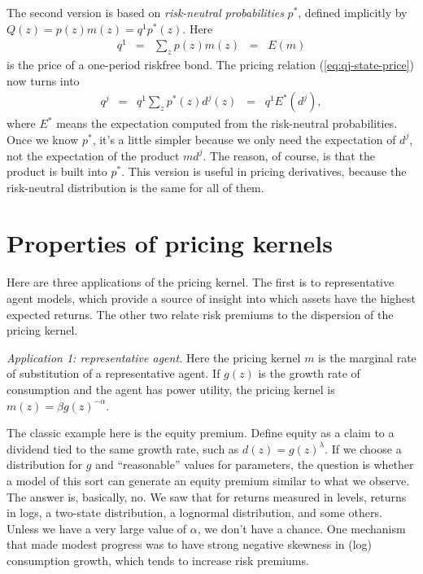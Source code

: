 \documentclass[11pt]{article}
\begin{document}
The second version is based on
{\it risk-neutral probabilities\/} $p^*$,
defined implicitly by $ Q(z) = p(z) m(z) = q^1 p^*(z)$.
Here
\begin{eqnarray*}
    q^1 &=& \sum_z p(z) m(z) \;\;=\;\; E(m)
\end{eqnarray*}
is the price of a one-period riskfree bond.
The pricing relation (\ref{eq:qj-state-price}) now turns into
\begin{eqnarray}
    q^j &=& q^1 \sum_z p^*(z) d^j(z)  \;\;=\;\; q^1 E^* (d^j) ,
    \label{eq:q=Estar-d}
\end{eqnarray}
where $E^*$ means the expectation computed from the risk-neutral probabilities.
Once we know $p^*$, it's a little simpler because we only need the
expectation of $d^j$, not the expectation of the product $m d^j$.
The reason, of course, is that the product is built into $p^*$.
This version is useful in pricing derivatives,
because the risk-neutral distribution is the same for all of them.


\section{Properties of pricing kernels}

Here are three applications of the pricing kernel.
The first is to representative agent models,
which provide a source of insight into which assets have
the highest expected returns.
The other two relate risk premiums to the dispersion of the pricing kernel.

{\it Application 1:  representative agent.\/}
Here the pricing kernel $m$ is the marginal rate of substitution
of a representative agent.
If $g(z)$ is the growth rate of consumption and the agent has power utility,
the pricing kernel is
$ m(z) = \beta g(z)^{-\alpha}$.

The classic example here is the equity premium.
Define equity as a claim to a dividend tied to the same growth rate,
such as $ d(z) = g(z)^\lambda$.
If we choose a distribution for $g$ and ``reasonable'' values for  parameters,
the question is whether a model of this sort can generate an equity premium similar
to what we observe.
The answer is, basically, no.
We saw that for returns measured in levels, returns in logs,
a two-state distribution, a lognormal distribution, and some others.
Unless we have a very large value of $\alpha$, we don't have a chance.
One mechanism that made modest progress was to have strong negative skewness
in (log) consumption growth, which tends to increase risk premiums.
\end{document}
